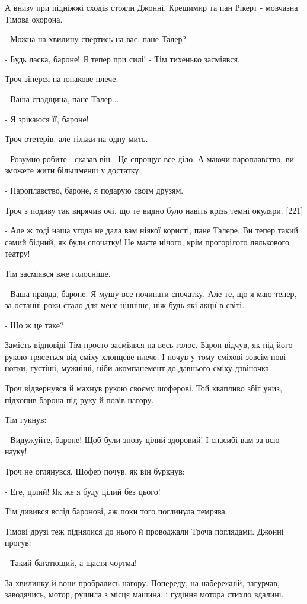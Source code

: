 А внизу при підніжжі сходів стояли Джонні. Крешимир та пан Рікерт - мовчазна Тімова охорона.

- Можна на хвилину спертись на вас. пане Талер?

- Будь ласка, бароне! Я тепер при силі! - Тім тихенько засміявся.

Троч зіперся на юнакове плече.

- Ваша спадщина, пане Талер...

- Я зрікаюся її, бароне!

Троч отетерів, але тільки на одну мить.

- Розумно робите.- сказав він.- Це спрощує все діло. А маючи пароплавство, ви зможете жити більшменш у достатку.

- Пароплавство, бароне, я подарую своїм друзям.

Троч з подиву так вирячив очі. що те видно було навіть крізь темні окуляри. [221]

- Але ж тоді наша угода не дала вам ніякої користі, пане Талере. Ви тепер такий самий бідний, як були спочатку! Не маєте нічого, крім прогорілого лялькового театру!

Тім засміявся вже голосніше.

- Ваша правда, бароне. Я мушу все починати спочатку. Але те, що я маю тепер, за останні роки стало для мене цінніше, ніж будь-які акції в світі.

- Що ж це таке?

Замість відповіді Тім просто засміявся на весь голос. Барон відчув, як під його рукою трясеться від сміху хлопцеве плече. І почув у тому сміхові зовсім нові нотки, густіші, мужніші, ніби акомпанемент до давнього сміху-дзвіночка.

Троч відвернувся й махнув рукою своєму шоферові. Той квапливо збіг униз, підхопив барона під руку й повів нагору.

Тім гукнув:

- Видужуйте, бароне! Щоб були знову цілий-здоровий! І спасибі вам за всю науку!

Троч не оглянувся. Шофер почув, як він буркнув:

- Еге, цілий! Як же я буду цілий без цього!

Тім дивився вслід баронові, аж поки того поглинула темрява.

Тімові друзі теж піднялися до нього й проводжали Троча поглядами. Джонні прогув:

- Такий багатющий, а щастя чортма!

За хвилинку й вони пробрались нагору. Попереду, на набережній, загурчав, заводячись, мотор, рушила з місця машина, і гудіння мотора стихло вдалині.

